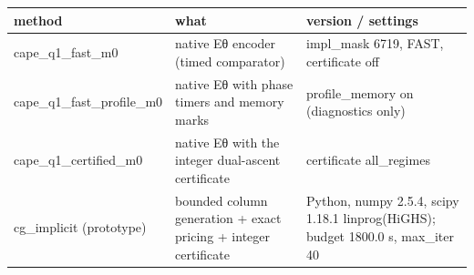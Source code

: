 \begin{tabular}{lll}
\hline
method & what & version / settings \\
\hline
cape\_q1\_fast\_m0 & native Eθ encoder (timed comparator) & impl\_mask 6719, FAST, certificate off \\
cape\_q1\_fast\_profile\_m0 & native Eθ with phase timers and memory marks & profile\_memory on (diagnostics only) \\
cape\_q1\_certified\_m0 & native Eθ with the integer dual-ascent certificate & certificate all\_regimes \\
cg\_implicit (prototype) & bounded column generation + exact pricing + integer certificate & Python, numpy 2.5.4, scipy 1.18.1 linprog(HiGHS); budget 1800.0 s, max\_iter 40 \\
\hline
\end{tabular}
